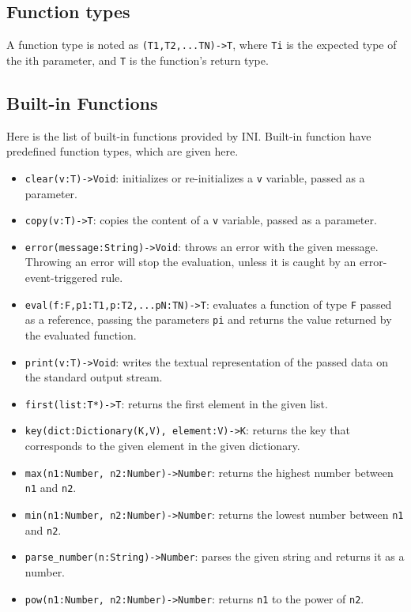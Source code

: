 \documentclass[11pt]{report}
\begin{document}
\subsection{Function types}

A function type is noted as \texttt{(T1,T2,...TN)->T}, where \texttt{Ti} is the expected type of the ith parameter, and \texttt{T} is the function's return type.

\subsection{Built-in Functions\label{sec:built_in_functions} }

Here is the list of built-in functions provided by INI. Built-in function have predefined function types, which are given here.

\begin{itemize}
\item \texttt{clear(v:T)->Void}: initializes or re-initializes a \texttt{v} variable, passed as a parameter.
\item \texttt{copy(v:T)->T}: copies the content of a \texttt{v} variable, passed as a parameter.
\item \texttt{error(message:String)->Void}: throws an error with the given message. Throwing an error will stop the evaluation, unless it is caught by an error-event-triggered rule.
\item \texttt{eval(f:F,p1:T1,p:T2,...pN:TN)->T}: evaluates a function of type \texttt{F} passed as a reference, passing the parameters \texttt{pi} and returns the value returned by the evaluated function.
\item \texttt{print(v:T)->Void}: writes the textual representation of the passed data on the standard output stream.
\item \texttt{first(list:T*)->T}: returns the first element in the given list.
\item \texttt{key(dict:Dictionary(K,V), element:V)->K}: returns the key that corresponds to the given element in the given dictionary.
\item \texttt{max(n1:Number, n2:Number)->Number}: returns the highest number between \texttt{n1} and \texttt{n2}.
\item \texttt{min(n1:Number, n2:Number)->Number}: returns the lowest number between \texttt{n1} and \texttt{n2}.
\item \texttt{parse\_number(n:String)->Number}: parses the given string and returns it as a number.
\item \texttt{pow(n1:Number, n2:Number)->Number}: returns \texttt{n1} to the power of \texttt{n2}.

\end{itemize}
\end{document}
